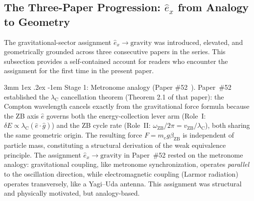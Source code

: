 \documentclass[%
 reprint, amsmath,amssymb, aps, prd, ]{revtex4-2}
\makeatletter
\numberwithin{equation}{section}
\renewcommand\paragraph{%
  \@startsection{paragraph}{4}{\z@}%
    {3mm \@plus 1ex \@minus .2ex}%
    {-1em}%
    {\normalfont\normalsize\itshape}}
\newcommand{\vZB}{v_{\mathrm{ZB}}}
\newcommand{\betaZB}{\beta_{\mathrm{ZB}}}
\newcommand{\ehat}[1]{\hat{e}_{#1}}
\makeatother
\begin{document}
\subsection{The Three-Paper Progression: $\ehat{x}$ from Analogy to Geometry}
\label{app:three_paper}

The gravitational-sector assignment $\ehat{x} \to \text{gravity}$ was introduced, elevated, and geometrically grounded across three consecutive papers in the series.
This subsection provides a self-contained account for readers who encounter the assignment for the first time in the present paper.

\paragraph{Stage 1: Metronome analogy (Paper \#52~\cite{hanamura52}).}
Paper~\#52 established the $\lambda_\mathrm{C}$ cancellation theorem (Theorem 2.1 of that paper): the Compton wavelength cancels exactly from the gravitational force formula because the ZB axis $\hat{e}$ governs both the energy-collection lever arm (Role~I: $\delta E \propto \lambda_\mathrm{C}(\hat{e}\cdot\hat{g})$) and the ZB cycle rate (Role~II: $\omega_\mathrm{ZB}/2\pi = \vZB/\lambda_\mathrm{C}$), both sharing the same geometric origin.
The resulting force $F = m_e g \betaZB$ is independent of particle mass, constituting a structural derivation of the weak equivalence principle.
The assignment $\ehat{x} \to \text{gravity}$ in Paper~\#52 rested on the metronome analogy: gravitational coupling, like metronome synchronization, operates \emph{parallel} to the oscillation direction, while electromagnetic coupling (Larmor radiation) operates transversely, like a Yagi--Uda antenna.
This assignment was structural and physically motivated, but analogy-based.
\end{document}
